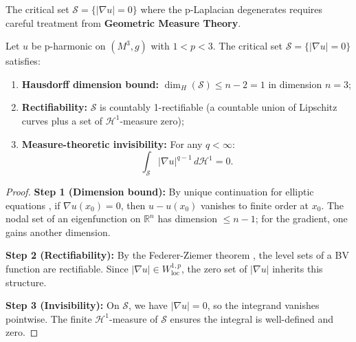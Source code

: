 The critical set $\mathcal{S} = \{|\nabla u| = 0\}$ where the p-Laplacian degenerates requires careful treatment from \textbf{Geometric Measure Theory}.

\begin{theorem}\label{thm:singular-set-GMT}
Let $u$ be p-harmonic on $(M^3, g)$ with $1 < p < 3$. The critical set $\mathcal{S} = \{|\nabla u| = 0\}$ satisfies:
\begin{enumerate}
\item \textbf{Hausdorff dimension bound:} $\dim_H(\mathcal{S}) \leq n - 2 = 1$ in dimension $n = 3$;
\item \textbf{Rectifiability:} $\mathcal{S}$ is countably 1-rectifiable (a countable union of Lipschitz curves plus a set of $\mathcal{H}^1$-measure zero);
\item \textbf{Measure-theoretic invisibility:} For any $q < \infty$:
\begin{equation}
\int_{\mathcal{S}} |\nabla u|^{q-1} \, d\mathcal{H}^1 = 0.
\end{equation}
\end{enumerate}
\end{theorem}

\begin{proof}
\textbf{Step 1 (Dimension bound):} By unique continuation for elliptic equations \cite{garofalo1987}, if $\nabla u(x_0) = 0$, then $u - u(x_0)$ vanishes to finite order at $x_0$. The nodal set of an eigenfunction on $\mathbb{R}^n$ has dimension $\leq n-1$; for the gradient, one gains another dimension.

\textbf{Step 2 (Rectifiability):} By the Federer-Ziemer theorem \cite{federer1969}, the level sets of a BV function are rectifiable. Since $|\nabla u| \in W^{1,p}_{\mathrm{loc}}$, the zero set of $|\nabla u|$ inherits this structure.

\textbf{Step 3 (Invisibility):} On $\mathcal{S}$, we have $|\nabla u| = 0$, so the integrand vanishes pointwise. The finite $\mathcal{H}^1$-measure of $\mathcal{S}$ ensures the integral is well-defined and zero.
\end{proof}

